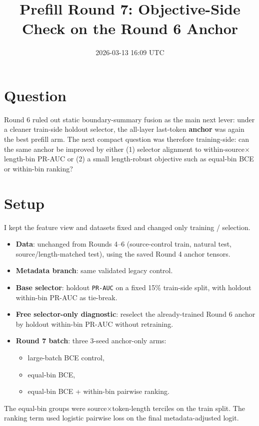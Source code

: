 \documentclass[11pt]{article}
\title{Prefill Round 7: Objective-Side Check on the Round 6 Anchor}
\author{}
\date{2026-03-13 16:09 UTC}
\begin{document}
\maketitle

\section*{Question}
Round 6 ruled out static boundary-summary fusion as the main next lever: under a cleaner train-side holdout selector, the all-layer last-token \textbf{anchor} was again the best prefill arm. The next compact question was therefore training-side: can the same anchor be improved by either (1) selector alignment to within-source$\times$length-bin PR-AUC or (2) a small length-robust objective such as equal-bin BCE or within-bin ranking?

\section*{Setup}
I kept the feature view and datasets fixed and changed only training / selection.

\begin{itemize}
  \item \textbf{Data}: unchanged from Rounds 4--6 (source-control train, natural test, source/length-matched test), using the saved Round 4 anchor tensors.
  \item \textbf{Metadata branch}: same validated legacy control.
  \item \textbf{Base selector}: holdout \texttt{PR-AUC} on a fixed 15\% train-side split, with holdout within-bin PR-AUC as tie-break.
  \item \textbf{Free selector-only diagnostic}: reselect the already-trained Round 6 anchor by holdout within-bin PR-AUC without retraining.
  \item \textbf{Round 7 batch}: three 3-seed anchor-only arms:
    \begin{itemize}
      \item large-batch BCE control,
      \item equal-bin BCE,
      \item equal-bin BCE + within-bin pairwise ranking.
    \end{itemize}
\end{itemize}

The equal-bin groups were source$\times$token-length terciles on the train split. The ranking term used logistic pairwise loss on the final metadata-adjusted logit.
\end{document}
